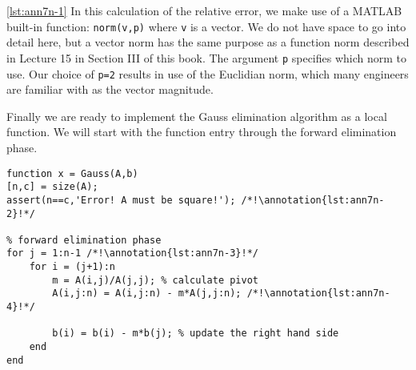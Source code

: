 \vspace{0.1cm}

\noindent \ref{lst:ann7n-1} In this calculation of the relative error, we make use of a MATLAB built-in function: \lstinline[style=myMatlab]{norm(v,p)} where \lstinline[style=myMatlab]{v} is a vector.  We do not have space to go into detail here, but a vector norm has the same purpose as a function norm described in Lecture 15 in Section III of this book. The argument \lstinline[style=myMatlab]{p} specifies which norm to use.  Our choice of \lstinline[style=myMatlab]{p=2} results in use of the Euclidian norm, which many engineers are familiar with as the vector magnitude.

\vspace{0.25cm}

\noindent Finally we are ready to implement the Gauss elimination algorithm as a local function. We will start with the function entry through the forward elimination phase. 
\begin{lstlisting}[style=myMatlab, name=lec7n-ex1]
%% Local function implementing Gauss Elimination
function x = Gauss(A,b)
[n,c] = size(A);
assert(n==c,'Error! A must be square!'); /*!\annotation{lst:ann7n-2}!*/

% forward elimination phase
for j = 1:n-1 /*!\annotation{lst:ann7n-3}!*/
    for i = (j+1):n 
        m = A(i,j)/A(j,j); % calculate pivot
        A(i,j:n) = A(i,j:n) - m*A(j,j:n); /*!\annotation{lst:ann7n-4}!*/
        
        b(i) = b(i) - m*b(j); % update the right hand side
    end
end
\end{lstlisting}
